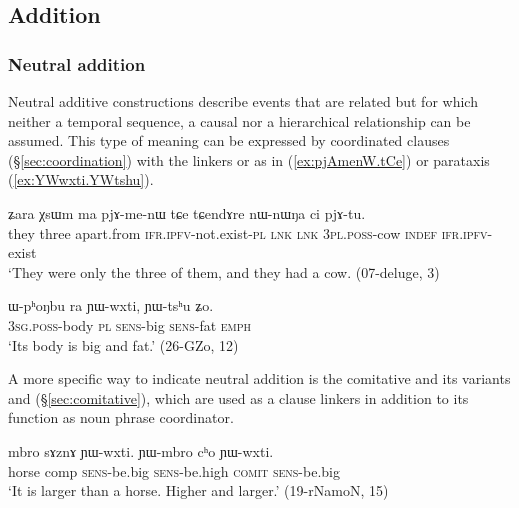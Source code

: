  \subsection{Addition} \label{sec:addition.clauses}
 
\subsubsection{Neutral addition} \label{sec:neutral.addition}
Neutral additive constructions describe events that are related but for which neither a temporal sequence, a causal nor a hierarchical relationship can be assumed. This type of meaning can be expressed by coordinated clauses (§\ref{sec:coordination}) with the linkers  or  as in (\ref{ex:pjAmenW.tCe}) or parataxis (\ref{ex:YWwxti.YWtshu}).


 \begin{exe}
\ex \label{ex:pjAmenW.tCe}
\gll ʑara χsɯm ma pjɤ-me-nɯ tɕe tɕendɤre nɯ-nɯŋa ci pjɤ-tu. \\
they three apart.from \textsc{ifr}.\textsc{ipfv}-not.exist-\textsc{pl} \textsc{lnk} \textsc{lnk} \textsc{3pl}.\textsc{poss}-cow \textsc{indef} \textsc{ifr}.\textsc{ipfv}-exist \\
\glt `They were only the three of them, and they had a cow. (07-deluge, 3)
\end{exe}
 

\begin{exe}
\ex \label{ex:YWwxti.YWtshu}
\gll ɯ-pʰoŋbu ra ɲɯ-wxti, ɲɯ-tsʰu ʑo.  \\
\textsc{3sg}.\textsc{poss}-body \textsc{pl} \textsc{sens}-big \textsc{sens}-fat \textsc{emph} \\
\glt `Its body is big and fat.' (26-GZo, 12)
\end{exe}
 
 A more specific way to indicate neutral addition is the comitative  and its variants  and  (§\ref{sec:comitative}), which are used as a clause linkers in addition to its function as noun phrase coordinator.
 
\begin{exe}
\ex \label{ex:YWwxti.cho.YWwxti}
\gll  mbro sɤznɤ ɲɯ-wxti. ɲɯ-mbro cʰo ɲɯ-wxti. \\
horse comp \textsc{sens}-be.big  \textsc{sens}-be.high  \textsc{comit} \textsc{sens}-be.big \\
\glt `It is larger than a horse. Higher and larger.'  (19-rNamoN, 15)
\end{exe}
 
